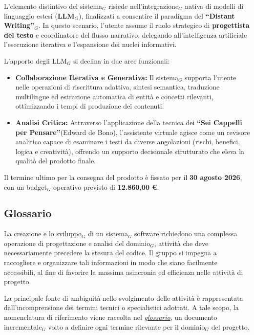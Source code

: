 \documentclass[a4paper, 10pt]{article}
\begin{document}
L'elemento distintivo del sistema$_G$ risiede nell'integrazione$_G$ nativa di modelli di linguaggio estesi (\textbf{LLM$_G$}), finalizzati a consentire il paradigma del \textbf{``Distant Writing''$_G$}. In questo scenario, l'utente assume il ruolo strategico di \textbf{progettista del testo} e coordinatore del flusso narrativo, delegando all'intelligenza artificiale l'esecuzione iterativa e l'espansione dei nuclei informativi.

L'apporto degli LLM$_G$ si declina in due aree funzionali:

\begin{itemize}
    \item \textbf{Collaborazione Iterativa e Generativa:} Il sistema$_G$ supporta l'utente nelle operazioni di riscrittura adattiva, sintesi semantica, traduzione multilingue ed estrazione automatica di entità e concetti rilevanti, ottimizzando i tempi di produzione dei contenuti.
    \item \textbf{Analisi Critica:} Attraverso l'applicazione della tecnica dei \textbf{``Sei Cappelli per Pensare''}(Edward de Bono), l'assistente virtuale agisce come un revisore analitico capace di esaminare i testi da diverse angolazioni (rischi, benefici, logica e creatività), offrendo un supporto decisionale strutturato che eleva la qualità del prodotto finale.
\end{itemize}

Il termine ultimo per la consegna del prodotto è fissato per il \textbf{30 agosto 2026}, con un budget$_G$ operativo previsto di \textbf{12.860,00 €}.

\subsection{Glossario}
La creazione e lo sviluppo$_G$ di un sistema$_G$ software richiedono una complessa operazione di progettazione e analisi del dominio$_G$, attività che deve necessariamente precedere la stesura del codice. Il gruppo si impegna a raccogliere e organizzare tali informazioni in modo che siano facilmente accessibili, al fine di favorire la massima asincronia ed efficienza nelle attività di progetto.

La principale fonte di ambiguità nello svolgimento delle attività è rappresentata dall'incomprensione dei termini tecnici o specialistici adottati. A tale scopo, la nomenclatura di riferimento viene raccolta nel \href{https://thebitless.live/RTB/doc_interna/glossario/glossario.pdf}{\textit{glossario}}, un documento incrementale$_G$ volto a definire ogni termine rilevante per il dominio$_G$ del progetto.
\end{document}
